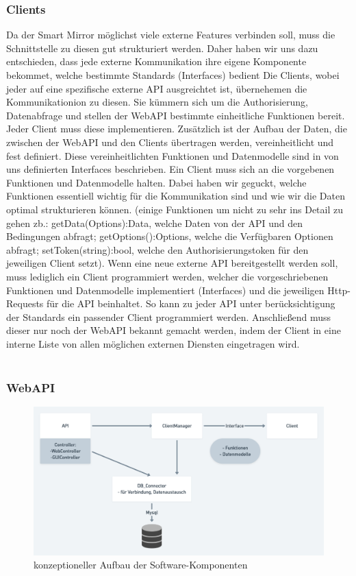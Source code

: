 \subsubsection{Clients}\label{Clients}
Da der Smart Mirror möglichst viele externe Features verbinden soll, muss die Schnittstelle zu diesen gut strukturiert werden. Daher haben wir uns dazu entschieden, dass jede externe Kommunikation ihre eigene Komponente bekommet, welche bestimmte Standards (Interfaces) bedient
Die Clients, wobei jeder auf eine spezifische externe API ausgreichtet ist, übernehemen die Kommunikationion zu diesen. Sie kümmern sich um die Authorisierung, Datenabfrage und stellen der WebAPI bestimmte einheitliche Funktionen bereit. Jeder Client muss diese implementieren. Zusätzlich ist der Aufbau der Daten, die zwischen der WebAPI und den Clients übertragen werden, vereinheitlicht und fest definiert. Diese vereinheitlichten Funktionen und Datenmodelle sind in von uns definierten Interfaces beschrieben. Ein Client muss sich an die vorgebenen Funktionen und Datenmodelle halten. Dabei haben wir geguckt, welche Funktionen essentiell wichtig für die Kommunikation sind und wie wir die Daten optimal strukturieren können. (einige Funktionen um nicht zu sehr ins Detail zu gehen zb.: getData(Options):Data, welche Daten von der API und den Bedingungen abfragt; getOptions():Options, welche die Verfügbaren Optionen abfragt; setToken(string):bool, welche den Authorisierungstoken für den jeweiligen Client setzt). Wenn eine neue externe API bereitgestellt werden soll, muss lediglich ein Client programmiert werden, welcher die vorgeschriebenen Funktionen und Datenmodelle implementiert (Interfaces) und die jeweiligen Http-Requests für die API beinhaltet. So kann zu jeder API unter berücksichtigung der Standards ein passender Client programmiert werden. Anschließend muss dieser nur noch der WebAPI bekannt gemacht werden, indem der Client in eine interne Liste von allen möglichen externen Diensten eingetragen wird.\\\
\subsubsection{WebAPI}
\begin{figure}[h]
\centering
\includegraphics[width=120mm]{pictures/WebAPI.png}
\caption{konzeptioneller Aufbau der Software-Komponenten}
\end{figure}
